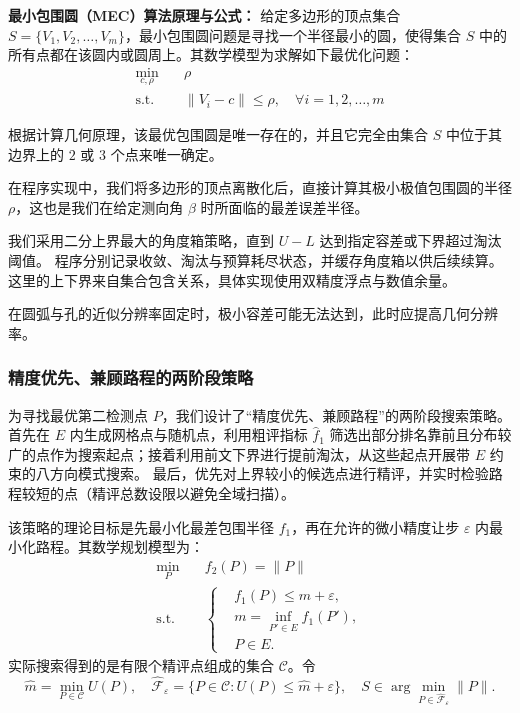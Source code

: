 \documentclass[withoutpreface,bwprint]{cumcmthesis} %
\begin{document}
\textbf{最小包围圆（MEC）算法原理与公式：}
给定多边形的顶点集合 $S = \{V_1, V_2, \dots, V_m\}$，最小包围圆问题是寻找一个半径最小的圆，使得集合 $S$ 中的所有点都在该圆内或圆周上。其数学模型为求解如下最优化问题：
\begin{equation}
\begin{aligned}
\min_{c, \rho} \quad & \rho \\
\text{s.t.} \quad & \|V_i - c\| \le \rho, \quad \forall i=1,2,\dots,m
\end{aligned}
\end{equation}

根据计算几何原理，该最优包围圆是唯一存在的，并且它完全由集合 $S$ 中位于其边界上的 $2$ 或 $3$ 个点来唯一确定。

在程序实现中，我们将多边形的顶点离散化后，直接计算其极小极值包围圆的半径 $\rho$，这也是我们在给定测向角 $\beta$ 时所面临的最差误差半径。

我们采用二分上界最大的角度箱策略，直到 $U-L$ 达到指定容差或下界超过淘汰阈值。
程序分别记录收敛、淘汰与预算耗尽状态，并缓存角度箱以供后续续算。
这里的上下界来自集合包含关系，具体实现使用双精度浮点与数值余量。

在圆弧与孔的近似分辨率固定时，极小容差可能无法达到，此时应提高几何分辨率。

\subsubsection{精度优先、兼顾路程的两阶段策略}

为寻找最优第二检测点 $P$，我们设计了“精度优先、兼顾路程”的两阶段搜索策略。
首先在 $E$ 内生成网格点与随机点，利用粗评指标 $\widehat f_1$ 筛选出部分排名靠前且分布较广的点作为搜索起点；接着利用前文下界进行提前淘汰，从这些起点开展带 $E$ 约束的八方向模式搜索。
最后，优先对上界较小的候选点进行精评，并实时检验路程较短的点（精评总数设限以避免全域扫描）。

该策略的理论目标是先最小化最差包围半径 $f_1$，再在允许的微小精度让步 $\varepsilon$ 内最小化路程。其数学规划模型为：
\begin{equation}
\begin{aligned}
\min_{P} \quad & f_2(P) = \|P\| \\
\text{s.t.} \quad & \left\{
\begin{aligned}
& f_1(P) \le m + \varepsilon, \\
& m = \inf_{P'\in E} f_1(P'), \\
& P \in E.
\end{aligned}
\right.
\end{aligned}
\end{equation}
实际搜索得到的是有限个精评点组成的集合 $\mathcal C$。令
\begin{equation*}
\widehat m=\min_{P\in\mathcal C}U(P),\quad
\widehat{\mathcal F}_\varepsilon=
\{P\in\mathcal C:U(P)\le\widehat m+\varepsilon\},\quad
S\in\arg\min_{P\in\widehat{\mathcal F}_\varepsilon}\|P\|.
\end{equation*}
\end{document}
